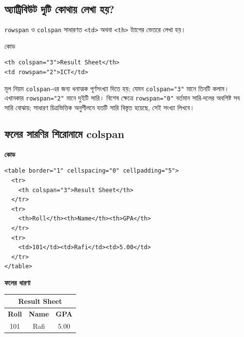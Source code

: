 \subsection{অ্যাট্রিবিউট দুটি কোথায় লেখা হয়?}

\texttt{rowspan} ও \texttt{colspan} সাধারণত \texttt{<td>} অথবা \texttt{<th>} ট্যাগের ভেতরে লেখা হয়।

\begin{examplebox}{কোড}
\begin{verbatim}
<th colspan="3">Result Sheet</th>
<td rowspan="2">ICT</td>
\end{verbatim}
\end{examplebox}

\begin{keypointbox}{মূল নিয়ম}
\texttt{colspan}-এর জন্য ধনাত্মক পূর্ণসংখ্যা দিতে হয়; যেমন \texttt{colspan="3"} মানে তিনটি কলাম। এখানকার \texttt{rowspan="2"} মানে দুইটি সারি। বিশেষ ক্ষেত্রে \texttt{rowspan="0"} বর্তমান সারি-দলের অবশিষ্ট সব সারি বোঝায়; সাধারণ চিত্রভিত্তিক অনুশীলনে যতটি সারি বিস্তৃত হয়েছে, সেই সংখ্যা লিখবে।
\end{keypointbox}

\subsection{ফলের সারণির শিরোনামে colspan}

\par\noindent
\begin{minipage}[t]{.54\linewidth}\vspace{0pt}\small
\textbf{\color{chFourTeal}কোড}\par
\begin{verbatim}
<table border="1" cellspacing="0" cellpadding="5">
  <tr>
    <th colspan="3">Result Sheet</th>
  </tr>
  <tr>
    <th>Roll</th><th>Name</th><th>GPA</th>
  </tr>
  <tr>
    <td>101</td><td>Rafi</td><td>5.00</td>
  </tr>
</table>
\end{verbatim}
\par\smallskip
\end{minipage}\hfill
\begin{minipage}[t]{.42\linewidth}\vspace{0pt}\small
\textbf{\color{chFourTeal}ফলের ধারণা}\par
\begin{center}
\begin{tabular}{|c|c|c|}
\hline
\multicolumn{3}{|c|}{\textbf{Result Sheet}} \\
\hline
\textbf{Roll} & \textbf{Name} & \textbf{GPA} \\
\hline
101 & Rafi & 5.00 \\
\hline
\end{tabular}
\end{center}
\par\smallskip
\end{minipage}\par


